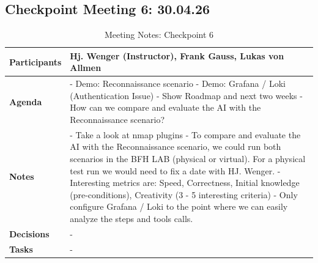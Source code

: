 \subsection{Checkpoint Meeting 6: 30.04.26}\label{subsec:checkpoint-meeting-6}

\begin{table}[H]
	\centering
	\begin{tabular}{p{2.5cm} | p{10cm}}

		\textbf{Participants} &
		Hj. Wenger (Instructor), Frank Gauss, Lukas von Allmen\\[6pt]
		\hline

		\textbf{Agenda} &
		- Demo: Reconnaissance scenario\newline
		- Demo: Grafana / Loki (Authentication Issue)\newline
		- Show Roadmap and next two weeks\newline
		- How can we compare and evaluate the \gls{AI} with the Reconnaissance scenario? \\
		\hline

		\textbf{Notes} &
		- Take a look at nmap plugins\newline
		- To compare and evaluate the \gls{AI} with the Reconnaissance scenario,
		we could run both scenarios in the BFH LAB (physical or virtual).
		For a physical test run we would need to fix a date with HJ. Wenger.\newline
		- Interesting metrics are: Speed, Correctness, Initial knowledge (pre-conditions), Creativity (3 - 5 interesting criteria)\newline
		- Only configure Grafana / Loki to the point where we can easily analyze the steps and tools calls.\\
		\hline

		\textbf{Decisions} &
		- \\
		\hline

		\textbf{Tasks} &
		- \\

	\end{tabular}
	\caption{Meeting Notes: Checkpoint 6}
	\label{tab:meeting-notes-checkpoint-6}
\end{table}
